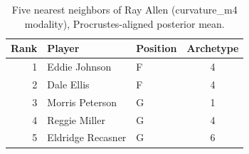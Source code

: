 \begin{table}[htbp]
  \centering\small
  \begin{tabular}{rllc}
    \toprule
    Rank & Player & Position & Archetype \\
    \midrule
    1 & Eddie Johnson & F & 4 \\
    2 & Dale Ellis & F & 4 \\
    3 & Morris Peterson & G & 1 \\
    4 & Reggie Miller & G & 4 \\
    5 & Eldridge Recasner & G & 6 \\
    \bottomrule
  \end{tabular}
  \caption{Five nearest neighbors of Ray Allen (curvature_m4 modality), Procrustes-aligned posterior mean.}
  \label{tab:Ray_Allen_neighbors_curvature_m4}
\end{table}

